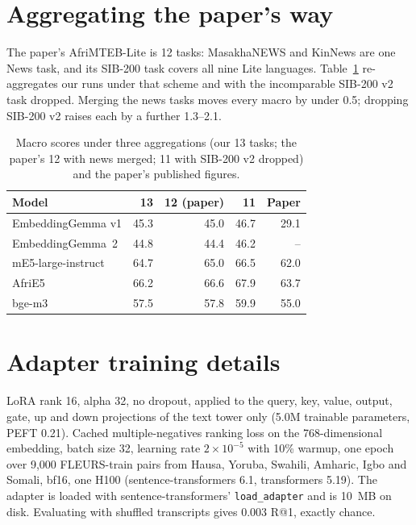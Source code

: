 \documentclass[11pt]{article}
\makeatletter
\newcommand{\eg}{EmbeddingGemma}
\newcommand{\egtwo}{EmbeddingGemma~2}
\newcommand{\rone}{R@1}
\makeatother
\begin{document}
\section{Aggregating the paper's way}
\label{app:agg}

The paper's AfriMTEB-Lite is 12 tasks: MasakhaNEWS and KinNews are one News
task, and its SIB-200 task covers all nine Lite languages. Table~\ref{tab:agg}
re-aggregates our runs under that scheme and with the incomparable SIB-200 v2
task dropped. Merging the news tasks moves every macro by under 0.5; dropping SIB-200 v2 raises each by a further 1.3--2.1.

\begin{table}[h]
  \centering
  \small
  \setlength{\tabcolsep}{4pt}
  \begin{tabular}{lrrrr}
    \toprule
    Model & 13 & 12 (paper) & 11 & Paper \\
    \midrule
    \eg{} v1 & 45.3 & 45.0 & 46.7 & 29.1 \\
    \egtwo{} & 44.8 & 44.4 & 46.2 & -- \\
    mE5-large-instruct & 64.7 & 65.0 & 66.5 & 62.0 \\
    AfriE5 & 66.2 & 66.6 & 67.9 & 63.7 \\
    bge-m3 & 57.5 & 57.8 & 59.9 & 55.0 \\
    \bottomrule
  \end{tabular}
  \caption{Macro scores under three aggregations (our 13 tasks; the paper's
  12 with news merged; 11 with SIB-200 v2 dropped) and the paper's published
  figures.}
  \label{tab:agg}
\end{table}

\section{Adapter training details}
\label{app:train}

LoRA rank 16, alpha 32, no dropout, applied to the query, key, value, output,
gate, up and down projections of the text tower only (5.0M trainable
parameters, PEFT 0.21). Cached multiple-negatives ranking loss on the
768-dimensional embedding, batch size 32, learning rate $2\times10^{-5}$ with
10\% warmup, one epoch over 9,000 FLEURS-train pairs from Hausa, Yoruba,
Swahili, Amharic, Igbo and Somali, bf16, one H100 (sentence-transformers 6.1,
transformers 5.19). The adapter is loaded with sentence-transformers'
\texttt{load\_adapter} and is 10~MB on disk. Evaluating with shuffled
transcripts gives 0.003 \rone{}, exactly chance.
\end{document}
